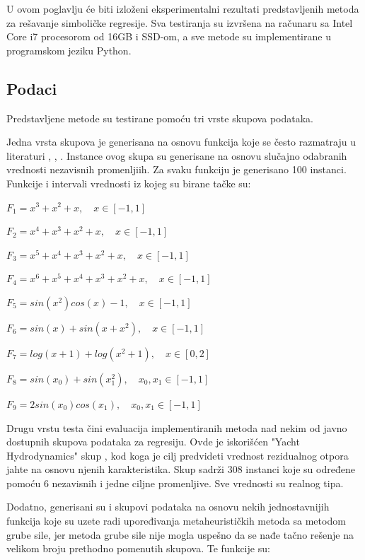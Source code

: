 \documentclass[main.tex]{subfiles}
\begin{document}
U ovom poglavlju će biti izloženi eksperimentalni rezultati predstavljenih metoda za rešavanje simboličke regresije. Sva testiranja su izvršena na računaru sa Intel Core i7 procesorom od 16GB i SSD-om, a sve metode su implementirane u programskom jeziku Python.

\subsection{Podaci}
\label{sec:data}

Predstavljene metode su testirane pomoću tri vrste skupova podataka. 

Jedna vrsta skupova je generisana na osnovu funkcija koje se često razmatraju u literaturi \cite{vnp}, \cite{semanticCrossover}, \cite{beeColony}. Instance ovog skupa su generisane na osnovu slučajno odabranih vrednosti nezavisnih promenljiih. Za svaku funkciju je generisano 100 instanci. Funkcije i intervali vrednosti iz kojeg su birane tačke su:

$ F_1 = x^3 + x^2 + x, \quad x \in [-1, 1] $

$ F_2 = x^4 + x^3 + x^2 + x, \quad x \in [-1, 1] $

$ F_3 = x^5 + x^4 + x^3 + x^2 + x, \quad x \in [-1, 1] $

$ F_4 = x^6 + x^5 + x^4 + x^3 + x^2 + x, \quad x \in [-1, 1] $

$ F_5 = sin(x^2)cos(x) - 1, \quad x \in [-1, 1] $

$ F_6 = sin(x) + sin(x + x^2), \quad x \in [-1, 1] $

$ F_7 = log(x + 1) + log(x^2 + 1), \quad x \in [0, 2] $

$ F_8 = sin(x_0) + sin(x_1^2), \quad x_0, x_1 \in [-1, 1] $

$ F_9 = 2sin(x_0)cos(x_1), \quad x_0, x_1 \in [-1, 1] $



Drugu vrstu testa čini evaluacija implementiranih metoda nad nekim od javno dostupnih skupova podataka za regresiju. Ovde je iskorišćen "Yacht Hydrodynamics" skup \cite{datasetYacht}, kod koga je cilj predvideti vrednost rezidualnog otpora jahte na osnovu njenih karakteristika. Skup sadrži 308 instanci koje su određene pomoću 6 nezavisnih i jedne ciljne promenljive. Sve vrednosti su realnog tipa.

Dodatno, generisani su i skupovi podataka na osnovu nekih jednostavnijih funkcija koje su uzete radi upoređivanja metaheurističkih metoda sa metodom grube sile, jer metoda grube sile nije mogla uspešno da se nađe tačno rešenje na velikom broju prethodno pomenutih skupova. Te funkcije su:
\end{document}
